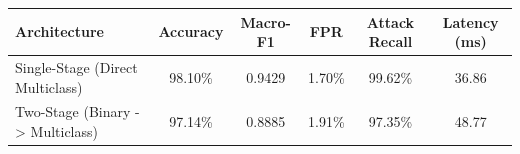 \begin{tabular}{lccccc}
\hline
Architecture & Accuracy & Macro-F1 & FPR & Attack Recall & Latency (ms) \\
\hline
Single-Stage (Direct Multiclass) & 98.10\% & 0.9429 & 1.70\% & 99.62\% & 36.86 \\
Two-Stage (Binary -> Multiclass) & 97.14\% & 0.8885 & 1.91\% & 97.35\% & 48.77 \\
\hline
\end{tabular}
